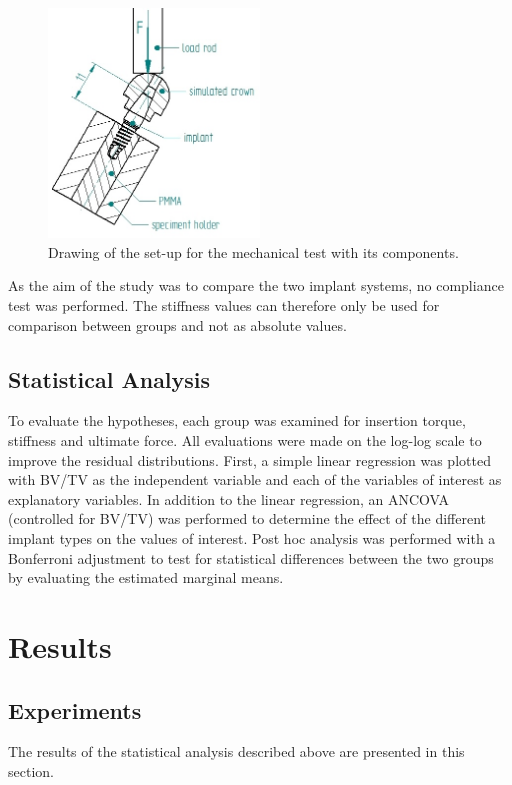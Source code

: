 \documentclass[12pt, a4paper, twoside]{report}
\begin{document}
\begin{figure}[H]
  \centering
      \includegraphics[width=0.5\textwidth]{figures/experiments/mechanical_setup}
  \caption{Drawing of the set-up for the mechanical test with its components.}
  \label{fig:mechanical_setup}
\end{figure} 

As the aim of the study was to compare the two implant systems, no compliance test was performed.
The stiffness values can therefore only be used for comparison between groups and not as absolute values.

\section{Statistical Analysis}
To evaluate the hypotheses, each group was examined for insertion torque, stiffness and ultimate force.
All evaluations were made on the log-log scale to improve the residual distributions.
First, a simple linear regression was plotted with BV/TV as the independent variable and each of the variables of interest as explanatory variables.
In addition to the linear regression, an ANCOVA (controlled for BV/TV) was performed to determine the effect of the different implant types on the values of interest.
Post hoc analysis was performed with a Bonferroni adjustment to test for statistical differences between the two groups by evaluating the estimated marginal means.

\chapter{Results}
%
\section{Experiments}
The results of the statistical analysis described above are presented in this section.
\end{document}
